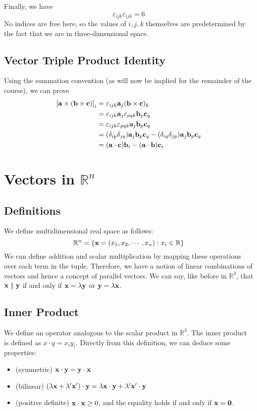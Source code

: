 \documentclass{article}
\begin{document}
Finally, we have
\[ \varepsilon_{ijk}\varepsilon_{ijk} = 6 \]
No indices are free here, so the values of $i, j, k$ themselves are predetermined by the fact that we are in three-dimensional space.

\subsection{Vector Triple Product Identity}
Using the summation convention (as will now be implied for the remainder of the course), we can prove
\begin{align*}
    \left[ \vb a \times (\vb b \times \vb c) \right]_i
     & = \varepsilon_{ijk} \vb a_j (\vb b \times \vb c)_k                                                  \\
     & = \varepsilon_{ijk} \vb a_j \varepsilon_{pqk} \vb b_p \vb c_q                                       \\
     & = \varepsilon_{ijk}\varepsilon_{pqk} \vb a_j \vb b_p \vb c_q                                        \\
     & = (\delta_{ip}\delta_{jq})\vb a_j \vb b_p \vb c_q - (\delta_{iq}\delta_{jp})\vb a_j \vb b_p \vb c_q \\
     & = (\vb a \cdot \vb c) \vb b_i - (\vb a \cdot \vb b) \vb c_i
\end{align*}

\section{Vectors in $\mathbb R^n$}
\subsection{Definitions}
We define multidimensional real space as follows:
\[ \mathbb R^n = \{ \vb x = (x_1, x_2, \cdots, x_n) : x_i \in \mathbb R \} \]
We can define addition and scalar multiplication by mapping these operations over each term in the tuple. Therefore, we have a notion of linear combinations of vectors and hence a concept of parallel vectors. We can say, like before in $\mathbb R^3$, that $\vb x \parallel \vb y$ if and only if $\vb x = \lambda \vb y$ or $\vb y = \lambda \vb x$.

\subsection{Inner Product}
We define an operator analogous to the scalar product in $\mathbb R^3$. The inner product is defined as $x \cdot y = x_i y_i$. Directly from this definition, we can deduce some properties:
\begin{itemize}
    \item (symmetric) $\vb x \cdot \vb y = \vb y \cdot \vb x$
    \item (bilinear) $(\lambda \vb x + \lambda'\vb x')\cdot \vb y = \lambda \vb x\cdot \vb y + \lambda' \vb x' \cdot \vb y$
    \item (positive definite) $\vb x \cdot \vb x \geq 0$, and the equality holds if and only if $\vb x = \vb 0$.
\end{itemize}
\end{document}
